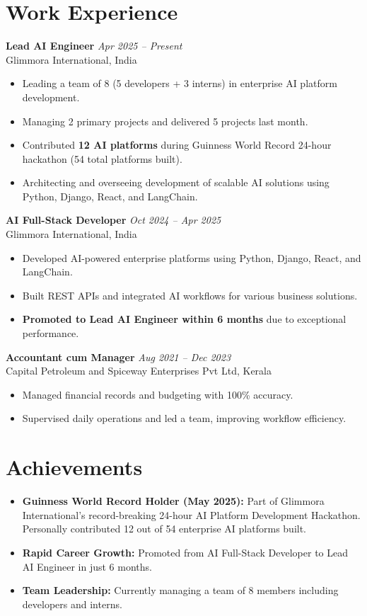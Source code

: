 \documentclass[a4paper,9.5pt]{article}
\newcommand{\job}[3]{%
  \noindent\textbf{#1} \hfill \textit{#2}\\%
  \RaggedRight #3\vspace{4pt}%
}
\begin{document}
\section*{Work Experience}

\job{Lead AI Engineer}{Apr 2025 -- Present}{%
Glimmora International, India
\begin{itemize}
    \item Leading a team of 8 (5 developers + 3 interns) in enterprise AI platform development.
    \item Managing 2 primary projects and delivered 5 projects last month.
    \item Contributed \textbf{12 AI platforms} during Guinness World Record 24-hour hackathon (54 total platforms built).
    \item Architecting and overseeing development of scalable AI solutions using Python, Django, React, and LangChain.
\end{itemize}
}

\job{AI Full-Stack Developer}{Oct 2024 -- Apr 2025}{%
Glimmora International, India
\begin{itemize}
    \item Developed AI-powered enterprise platforms using Python, Django, React, and LangChain.
    \item Built REST APIs and integrated AI workflows for various business solutions.
    \item \textbf{Promoted to Lead AI Engineer within 6 months} due to exceptional performance.
\end{itemize}
}

\job{Accountant cum Manager}{Aug 2021 -- Dec 2023}{%
Capital Petroleum and Spiceway Enterprises Pvt Ltd, Kerala
\begin{itemize}
    \item Managed financial records and budgeting with 100\% accuracy.
    \item Supervised daily operations and led a team, improving workflow efficiency.
\end{itemize}
}

\section*{Achievements}
\begin{itemize}
    \item \textbf{Guinness World Record Holder (May 2025):} Part of Glimmora International's record-breaking 24-hour AI Platform Development Hackathon. Personally contributed 12 out of 54 enterprise AI platforms built.
    \item \textbf{Rapid Career Growth:} Promoted from AI Full-Stack Developer to Lead AI Engineer in just 6 months.
    \item \textbf{Team Leadership:} Currently managing a team of 8 members including developers and interns.
\end{itemize}
\end{document}
